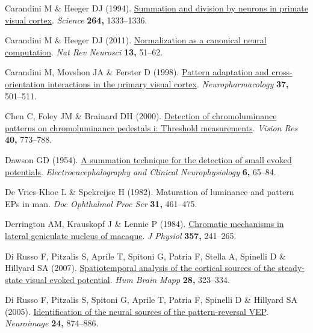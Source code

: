 \documentclass[
  letterpaper,
  DIV=11,
  numbers=noendperiod]{scrartcl}
\newlength{\cslhangindent}
\newenvironment{CSLReferences}[2] %
 {\begin{list}{}{%
  \setlength{\itemindent}{0pt}
  \setlength{\leftmargin}{0pt}
  \setlength{\parsep}{0pt}
  \ifodd #1
   \setlength{\leftmargin}{\cslhangindent}
   \setlength{\itemindent}{-1\cslhangindent}
  \fi
  \setlength{\itemsep}{#2\baselineskip}}}
 {\end{list}}
\begin{document}
\begin{CSLReferences}{1}{1}
Carandini M \& Heeger DJ (1994).
\href{https://doi.org/10.1126/science.8191289}{Summation and division by
neurons in primate visual cortex}. \emph{Science} \textbf{264,}
1333--1336.

Carandini M \& Heeger DJ (2011).
\href{https://doi.org/10.1038/nrn3136}{Normalization as a canonical
neural computation}. \emph{Nat Rev Neurosci} \textbf{13,} 51--62.

Carandini M, Movshon JA \& Ferster D (1998).
\href{https://doi.org/10.1016/s0028-3908(98)00069-0}{Pattern adaptation
and cross-orientation interactions in the primary visual cortex}.
\emph{Neuropharmacology} \textbf{37,} 501--511.

Chen C, Foley JM \& Brainard DH (2000).
\href{https://doi.org/10.1016/s0042-6989(99)00227-8}{Detection of
chromoluminance patterns on chromoluminance pedestals i: Threshold
measurements}. \emph{Vision Res} \textbf{40,} 773--788.

Dawson GD (1954). \href{https://doi.org/10.1016/0013-4694(54)90007-3}{A
summation technique for the detection of small evoked potentials}.
\emph{Electroencephalography and Clinical Neurophysiology} \textbf{6,}
65--84.

De Vries-Khoe L \& Spekreijse H (1982). Maturation of luminance and
pattern EPs in man. \emph{Doc Ophthalmol Proc Ser} \textbf{31,}
461--475.

Derrington AM, Krauskopf J \& Lennie P (1984).
\href{https://doi.org/10.1113/jphysiol.1984.sp015499}{Chromatic
mechanisms in lateral geniculate nucleus of macaque}. \emph{J Physiol}
\textbf{357,} 241--265.

Di Russo F, Pitzalis S, Aprile T, Spitoni G, Patria F, Stella A,
Spinelli D \& Hillyard SA (2007).
\href{https://doi.org/10.1002/hbm.20276}{Spatiotemporal analysis of the
cortical sources of the steady-state visual evoked potential}. \emph{Hum
Brain Mapp} \textbf{28,} 323--334.

Di Russo F, Pitzalis S, Spitoni G, Aprile T, Patria F, Spinelli D \&
Hillyard SA (2005).
\href{https://doi.org/10.1016/j.neuroimage.2004.09.029}{Identification
of the neural sources of the pattern-reversal VEP}. \emph{Neuroimage}
\textbf{24,} 874--886.


\end{CSLReferences}
\end{document}
